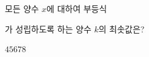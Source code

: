 모든 양수 $x$에 대하여 부등식 \par\smallskip{}\par\smallskip\noindent 가 성립하도록 하는 양수 $k$의 최솟값은?
\begin{choices32}{$4$}{$5$}{$6$}{$7$}{$8$}\end{choices32}
